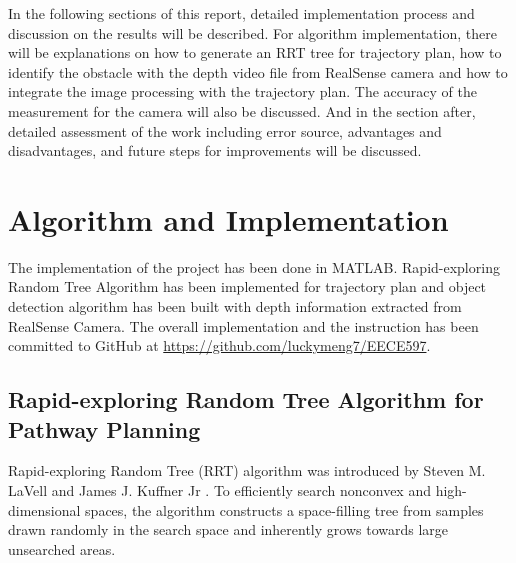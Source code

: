\documentclass[
  oneside]{ubcthesis}
\begin{document}
In the following sections of this report, detailed implementation process and discussion on the results will be described. For algorithm implementation, there will be explanations on how to generate an RRT tree for trajectory plan, how to identify the obstacle with the depth video file from RealSense camera and how to integrate the image processing with the trajectory plan. The accuracy of the measurement for the camera will also be discussed. And in the section after, detailed assessment of the work including error source, advantages and disadvantages, and future steps for improvements will be discussed.

\hypertarget{algorithm-and-implementation}{%
\chapter{Algorithm and Implementation}\label{algorithm-and-implementation}}

The implementation of the project has been done in MATLAB. Rapid-exploring Random Tree Algorithm has been implemented for trajectory plan and object detection algorithm has been built with depth information extracted from RealSense Camera. The overall implementation and the instruction has been committed to GitHub at \url{https://github.com/luckymeng7/EECE597}.

\hypertarget{rapid-exploring-random-tree-algorithm-for-pathway-planning}{%
\section{Rapid-exploring Random Tree Algorithm for Pathway Planning}\label{rapid-exploring-random-tree-algorithm-for-pathway-planning}}

Rapid-exploring Random Tree (RRT) algorithm was introduced by Steven M. LaVell and James J. Kuffner Jr \citep{rrt}. To efficiently search nonconvex and high-dimensional spaces, the algorithm constructs a space-filling tree from samples drawn randomly in the search space and inherently grows towards large unsearched areas.
\end{document}
